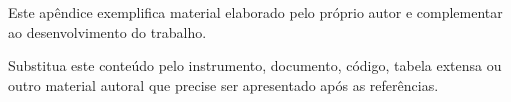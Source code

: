 \label{ap:exemplo-a}

Este apêndice exemplifica material elaborado pelo próprio autor e complementar ao desenvolvimento do trabalho.

Substitua este conteúdo pelo instrumento, documento, código, tabela extensa ou outro material autoral que precise ser apresentado após as referências.
